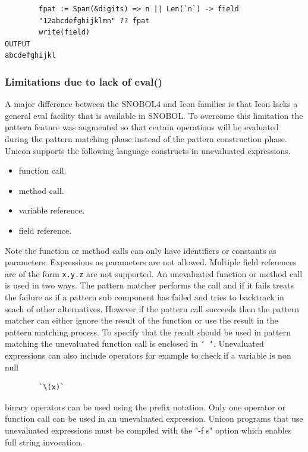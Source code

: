 \documentclass[letterpaper,12pt]{article}
\begin{document}
\begin{verbatim}
        fpat := Span(&digits) => n || Len(`n`) -> field        
        "12abcdefghijklmn" ?? fpat
        write(field)
OUTPUT
abcdefghijkl
\end{verbatim}

\subsubsection{Limitations due to lack of eval()}

A major difference between the SNOBOL4 and Icon families is that Icon
lacks a general eval facility that is available in SNOBOL. To overcome
this limitation the pattern feature was augmented so that certain
operations will be evaluated during the pattern matching phase instead
of the pattern construction phase.  Unicon supports the following
language constructs in unevaluated expressions.

\begin{itemize}
\item function call.
\item method call.
\item variable reference.
\item field reference.
\end{itemize}

Note the function or method calls can only have identifiers or
constants as parameters. Expressions as parameters are not
allowed. Multiple field references are of the form \texttt{x.y.z} are
not supported. An unevaluated function or method call is used in two
ways. The pattern matcher performs the call and if it fails treats the
failure as if a pattern sub component has failed and tries to
backtrack in seach of other alternatives. However if the pattern call
succeeds then the pattern matcher can either ignore the result of the
function or use the result in the pattern matching process. To specify
that the result should be used in pattern matching the unevaluated
function call is enclosed in \texttt{` `}.  Unevaluated expressions
can also include operators for example to check if a variable is non
null

\begin{verbatim}
        `\(x)`
\end{verbatim}

binary operators can be used using the prefix notation. Only one
operator or function call can be used in an unevaluated
expression. Unicon programs that use unevaluated expressions must be
compiled with the "-f s" option which enables full string invocation.
\end{document}
